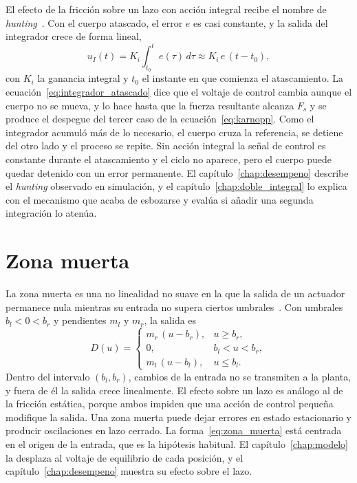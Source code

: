 El efecto de la fricción sobre un lazo con acción integral recibe el nombre de \emph{hunting}~\cite{olsson,armstrong}. Con el cuerpo atascado, el error $e$ es casi constante, y la salida del integrador crece de forma lineal,
\begin{equation}
u_I(t)=K_i\int_{t_0}^{t} e(\tau)\,d\tau \approx K_i\,e\,(t-t_0) ,
\label{eq:integrador_atascado}
\end{equation}
con $K_i$ la ganancia integral y $t_0$ el instante en que comienza el atascamiento. La ecuación~\eqref{eq:integrador_atascado} dice que el voltaje de control cambia aunque el cuerpo no se mueva, y lo hace hasta que la fuerza resultante alcanza $F_s$ y se produce el despegue del tercer caso de la ecuación~\eqref{eq:karnopp}. Como el integrador acumuló más de lo necesario, el cuerpo cruza la referencia, se detiene del otro lado y el proceso se repite. Sin acción integral la señal de control es constante durante el atascamiento y el ciclo no aparece, pero el cuerpo puede quedar detenido con un error permanente. El capítulo~\ref{chap:desempeno} describe el \emph{hunting} observado en simulación, y el capítulo~\ref{chap:doble_integral} lo explica con el mecanismo que acaba de esbozarse y evalúa si añadir una segunda integración lo atenúa.

\section{Zona muerta}\label{sec:fund_zona_muerta}

La zona muerta es una no linealidad no suave en la que la salida de un actuador permanece nula mientras su entrada no supera ciertos umbrales~\cite{gang}. Con umbrales $b_l<0<b_r$ y pendientes $m_l$ y $m_r$, la salida es
\begin{equation}
D(u)=
\begin{cases}
m_r\,(u-b_r), & u\ge b_r, \\
0, & b_l<u<b_r, \\
m_l\,(u-b_l), & u\le b_l .
\end{cases}
\label{eq:zona_muerta}
\end{equation}
Dentro del intervalo $(b_l,b_r)$, cambios de la entrada no se transmiten a la planta, y fuera de él la salida crece linealmente. El efecto sobre un lazo es análogo al de la fricción estática, porque ambos impiden que una acción de control pequeña modifique la salida. Una zona muerta puede dejar errores en estado estacionario y producir oscilaciones en lazo cerrado. La forma~\eqref{eq:zona_muerta} está centrada en el origen de la entrada, que es la hipótesis habitual. El capítulo~\ref{chap:modelo} la desplaza al voltaje de equilibrio de cada posición, y el capítulo~\ref{chap:desempeno} muestra su efecto sobre el lazo.

